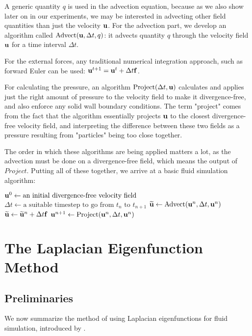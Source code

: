 A generic quantity $q$ is used in the advection equation, because as we also
show later on in our experiments, we may be interested in advecting other field
quantities than just the velocity $\vb{u}$. For the advection part, we develop
an algorithm called $\text{Advect}(\vb{u}, \Delta t, q)$: it advects quantity
$q$ through the velocity field $\vb{u}$ for a time interval $\Delta t$. 

For the external forces, any traditional numerical integration approach, such as
forward Euler can be used: $\vb{u}^{t+1} = \vb{u}^t + \Delta t \vb{f}$.

For calculating the pressure, an algorithm $\text{Project}(\Delta t, \vb{u})$
calculates and applies just the right amount of pressure to the velocity field
to make it divergence-free, and also enforce any solid wall boundary
conditions. The term "project" comes from the fact that the algorithm
essentially projects $\vb{u}$ to the closest divergence-free velocity field, and
interpreting the difference between these two fields as a pressure resulting
from "particles" being too close together. 

The order in which these algorithms are being applied matters a lot, as the
advection must be done on a divergence-free field, which means the output of
$Project$. Putting all of these together, we arrive at a basic fluid simulation
algorithm:

\begin{algorithmic}
    \State $\vb{u}^0 \gets \text{an initial divergence-free velocity field}$
        \State $\Delta t 
            \gets \text{a suitable timestep to go from $t_n$ to $t_{n+1}$}$
        \State $\widetilde{\vb{u}} 
            \gets \text{Advect}(\vb{u}^n,\Delta t, \vb{u}^n)$
        \State $\widetilde{\vb{u}} 
            \gets \widetilde{\vb{u}}^n + \Delta t \vb{f}$
        \State $\vb{u}^{n+1}
            \gets \text{Project}(\vb{u}^n,\Delta t, \vb{u}^n)$
            \EndFor {}
\end{algorithmic}




\section{The Laplacian Eigenfunction Method}
\label{section:laplacian-eigenfluids}
\subsection{Preliminaries}
We now summarize the method of using Laplacian eigenfunctions for fluid
simulation, introduced by \citet{dewitt}.


